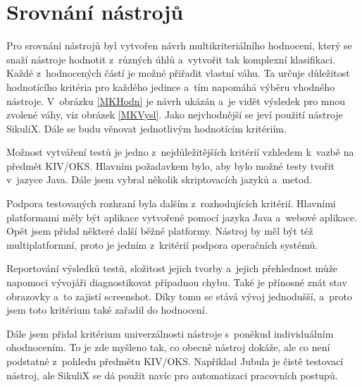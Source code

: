\chapter{Srovnání nástrojů}
Pro srovnání nástrojů byl vytvořen návrh multikriteriálního hodnocení, který se snaží nástroje hodnotit z~různých úhlů a~vytvořit tak komplexní klasifikaci. Každé z~hodnocených částí je možné přiřadit vlastní váhu. Ta určuje důležitost hodnotícího kritéria pro každého jedince a~tím napomáhá výběru vhodného nástroje. V~obrázku \ref{MKHodn} je návrh ukázán a~je vidět výsledek pro mnou zvolené váhy, viz obrázek \ref{MKVysl}. Jako nejvhodnější se jeví použití nástroje SikuliX. Dále se budu věnovat jednotlivým hodnotícím kritériím.

Možnost vytváření testů je jedno z~nejdůležitějších kritérií vzhledem k~vazbě na předmět KIV/OKS. Hlavním požadavkem bylo, aby bylo možné testy tvořit v~jazyce Java. Dále jsem vybral několik skriptovacích jazyků a~metod.

Podpora testovaných rozhraní byla dalším z~rozhodujících kritérií. Hlavními platformami měly být aplikace vytvořené pomocí jazyka Java a~webové aplikace. Opět jsem přidal některé další běžné platformy. Nástroj by měl být též multiplatformní, proto je jedním z~kritérií podpora operačních systémů.

Reportování výsledků testů, složitost jejich tvorby a~jejich přehlednost může napomoci vývojáři diagnostikovat případnou chybu. Také je přínosné znát stav obrazovky a~to zajistí screenshot. Díky tomu se stává vývoj jednodušší, a~proto jsem toto kritérium také zařadil do hodnocení.

Dále jsem přidal kritérium univerzálnosti nástroje s~poněkud individuálním ohodnocením. To je zde myšleno tak, co obecně nástroj dokáže, ale co není podstatné z~pohledu předmětu KIV/OKS. Například Jubula je čistě testovací nástroj, ale SikuliX se dá použít navíc pro automatizaci pracovních postupů.

